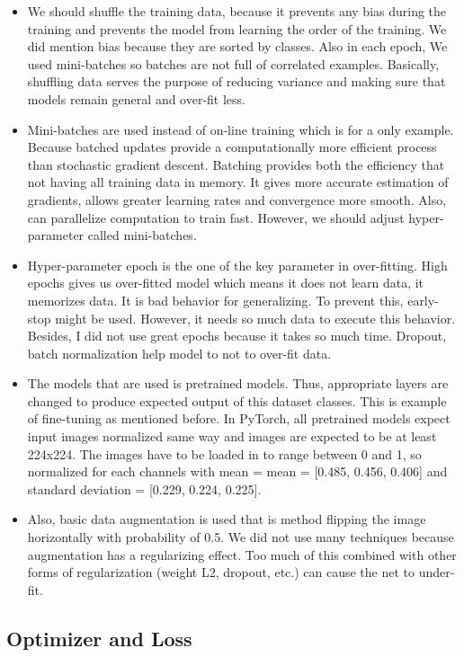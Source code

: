 \documentclass[12pt]{article}
\begin{document}
\begin{itemize}
\item We should shuffle the training data, because it prevents any bias during the training and prevents the model from learning the order of the training. We did mention bias because they are sorted by classes. Also in each epoch, We used mini-batches so batches are not full of correlated examples. Basically, shuffling data serves the purpose of reducing variance and making sure that models remain general and over-fit less.
\item Mini-batches are used instead of on-line training which is for a only example. Because batched updates provide a computationally more efficient process than stochastic gradient descent. Batching provides both the efficiency that not having all training data in memory. It gives more accurate estimation of gradients, allows greater learning rates and convergence more smooth. Also, can parallelize computation to train fast. However, we should adjust hyper-parameter called mini-batches.  
\item  Hyper-parameter epoch is the one of the key parameter in over-fitting. High epochs gives us over-fitted model which means it does not learn data, it memorizes data. It is bad behavior for generalizing. To prevent this, early-stop might be used. However, it needs so much data to execute this behavior. Besides, I did not use great epochs because it takes so much time. Dropout, batch normalization help model to not to over-fit data.
\item The models that are used is pretrained models. Thus, appropriate layers are changed to produce expected output of this dataset classes. This is example of fine-tuning as mentioned before. In PyTorch, all pretrained models expect input images normalized same way and images are expected to be at least 224x224. The images have to be loaded in to range between 0 and 1, so normalized for each channels with mean = mean = [0.485, 0.456, 0.406] and standard deviation = [0.229, 0.224, 0.225].
\item Also, basic data augmentation is used that is method flipping the image horizontally with probability of 0.5. We did not use many techniques because augmentation has a regularizing effect. Too much of this combined with other forms of regularization (weight L2, dropout, etc.) can cause the net to under-fit.
\end{itemize}
\subsection{Optimizer and Loss}
\end{document}
